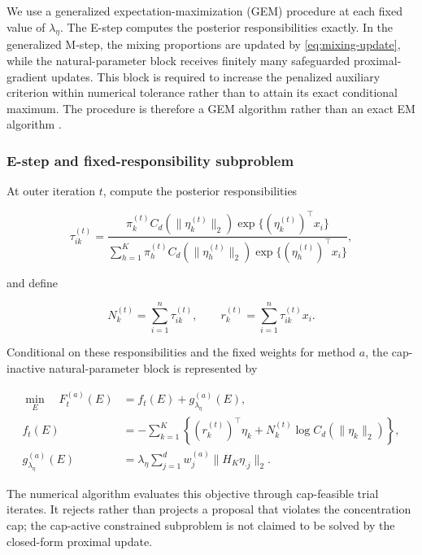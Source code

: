 \documentclass[preprint,12pt,authoryear]{elsarticle}
\newcounter{algorithm}
\begin{document}
We use a generalized expectation-maximization (GEM) procedure at each fixed
value of $\lambda_\eta$. The E-step computes the posterior responsibilities
exactly. In the generalized M-step, the mixing proportions are updated by
\eqref{eq:mixing-update}, while the natural-parameter block receives finitely
many safeguarded proximal-gradient updates. This block is required to increase
the penalized auxiliary criterion within numerical tolerance rather than to
attain its exact conditional maximum. The procedure is therefore a GEM
algorithm rather than an exact EM algorithm
\citep{dempster1977em,green1990penalizedem}.

\subsubsection{E-step and fixed-responsibility subproblem}
\label{sec:fixed-responsibility}

At outer iteration $t$, compute the posterior responsibilities

\begin{equation}
\label{eq:responsibilities}
\tau_{ik}^{(t)}
=\frac{\pi_k^{(t)}C_d(\lVert\eta_k^{(t)}\rVert_2)
\exp\{(\eta_k^{(t)})^\top x_i\}}
{\sum_{h=1}^K\pi_h^{(t)}C_d(\lVert\eta_h^{(t)}\rVert_2)
\exp\{(\eta_h^{(t)})^\top x_i\}},
\end{equation}

and define

\[
N_k^{(t)}=\sum_{i=1}^n\tau_{ik}^{(t)},
\qquad
r_k^{(t)}=\sum_{i=1}^n\tau_{ik}^{(t)}x_i.
\]

Conditional on these responsibilities and the fixed weights for method $a$,
the cap-inactive natural-parameter block is represented by

\begin{equation}
\label{eq:fixed-responsibility-objective}
\begin{aligned}
\min_E\quad F_t^{(a)}(E)
&=f_t(E)+g_{\lambda_\eta}^{(a)}(E),\\
f_t(E)
&=-\sum_{k=1}^K
\left\{
(r_k^{(t)})^\top\eta_k
+N_k^{(t)}\log C_d(\lVert\eta_k\rVert_2)
\right\},\\
g_{\lambda_\eta}^{(a)}(E)
&=\lambda_\eta\sum_{j=1}^d
w_j^{(a)}\lVert H_K\eta_{\cdot j}\rVert_2.
\end{aligned}
\end{equation}

The numerical algorithm evaluates this objective through cap-feasible trial
iterates. It rejects rather than projects a proposal that violates the
concentration cap; the cap-active constrained subproblem is not claimed to be
solved by the closed-form proximal update.
\end{document}

